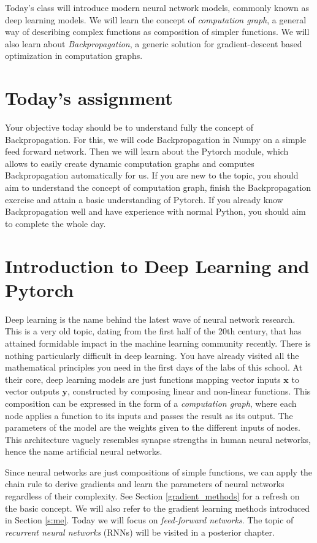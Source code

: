 Today's class will introduce modern neural network models, commonly known as
deep learning models. We will learn the concept of \textit{computation graph},
a general way of describing complex functions as composition of simpler
functions. We will also learn about \textit{Backpropagation}, a generic
solution for gradient-descent based optimization in computation graphs.


\section{Today's assignment}

Your objective today should be to understand fully the concept of
Backpropagation. For this, we will code Backpropagation in Numpy on a simple
feed forward network. Then we will learn about the Pytorch module, which allows
to easily create dynamic computation graphs and computes Backpropagation
automatically for us. If you are new to the topic, you should aim to understand
the concept of computation graph, finish the Backpropagation exercise and
attain a basic understanding of Pytorch. If you already know Backpropagation
well and have experience with normal Python, you should aim to complete the
whole day.

\section{Introduction to Deep Learning and Pytorch}

Deep learning is the name behind the latest wave of neural network research.
This is a very old topic, dating from the first half of the 20th century, that
has attained formidable impact in the machine learning community recently.
There is nothing particularly difficult in deep learning. You have already
visited all the mathematical principles you need in the first days of the labs
of this school. At their core, deep learning models are just functions mapping
vector inputs $\mathbf{x}$ to vector outputs $\mathbf{y}$, constructed by
composing linear and non-linear functions. This composition can be expressed in
the form of a \textit{computation graph}, where each node applies a function to
its inputs and passes the result as its output. The parameters of the model are
the weights given to the different inputs of nodes. This architecture vaguely
resembles synapse strengths in human neural networks, hence the name artificial
neural networks.

Since neural networks are just compositions of simple functions, we can apply
the chain rule to derive gradients and learn the parameters of neural networks
regardless of their complexity.
See Section \ref{gradient_methods} for a refresh on the basic concept. We
will also refer to the gradient learning methods introduced in Section
\ref{s:me}. Today we will focus on \textit{feed-forward networks}. The topic of
\textit{recurrent neural networks} (RNNs) will be visited in a posterior
chapter.

